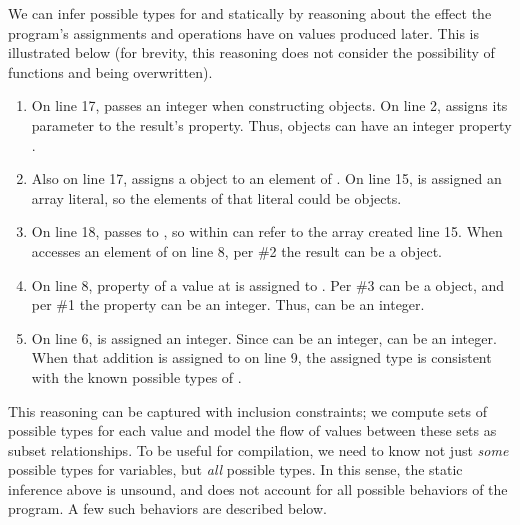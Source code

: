 We can infer possible types for  and  statically
by reasoning about the effect the program's assignments
and operations have on values produced later.
This is illustrated below (for brevity, this reasoning does not consider
the possibility of functions  and  being overwritten).

\begin{enumerate}
\item On line 17,  passes an integer when constructing 
      objects. On line 2,  assigns its parameter to the result's
       property. Thus,  objects can have an
      integer property .
\item Also on line 17,  assigns a  object to an element
      of . On line 15,  is assigned an array literal,
      so the elements of that literal could be  objects.
\item On line 18,  passes  to , so 
      within  can refer to the array created line 15.
      When  accesses an element of  on line 8,
      per \#2 the result can be a  object.
\item On line 8, property  of a value at  is assigned to .
      Per \#3  can be a  object, and per \#1 the
       property can be an integer. Thus,  can be an integer.
\item On line 6,  is assigned an integer. Since  can be
      an integer,  can be an integer.
      When that addition is assigned to  on line 9, the assigned
      type is consistent with the known possible types of .
\end{enumerate}

This reasoning can be captured with inclusion constraints; we compute
sets of possible types for each value and model the flow of values between
these sets as subset relationships.
To be useful for compilation, we need to know not just \emph{some}
possible types for variables, but \emph{all} possible types.
In this sense, the static inference above is unsound, and does not account
for all possible behaviors of the program.
A few such behaviors are described below.

